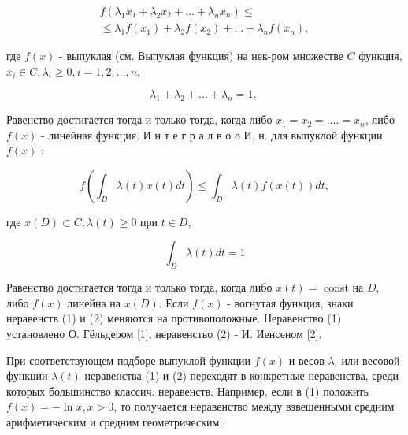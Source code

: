 \documentclass[10pt]{article}
\begin{document}
\[

\begin{gathered}

f\left(\lambda_{1} x_{1}+\lambda_{2} x_{2}+\ldots+\lambda_{n} x_{n}\right) \leqslant \\

\leqslant \lambda_{1} f\left(x_{1}\right)+\lambda_{2} f\left(x_{2}\right)+\ldots+\lambda_{n} f\left(x_{n}\right),

\end{gathered}

\]



где $f(x)$ - выпуклая (см. Выпуклая функция) на нек-ром множестве $C$ функция, $x_{i} \in C, \lambda_{i} \geqslant 0, i=1,2, \ldots, n$,



\[

\lambda_{1}+\lambda_{2}+\ldots+\lambda_{n}=1 \text {. }

\]



Равенство достигается тогда и только тогда, когда либо $x_{1}=x_{2}=\ldots .=x_{n}$, либо $f(x)$ - линейная функция. И н т е г р а л в о о И. н. для выпуклой функции $f(x)$ :



\[

f\left(\int_{D} \lambda(t) x(t) d t\right) \leqslant \int_{D} \lambda(t) f(x(t)) d t,

\]



где $x(D) \subset C, \lambda(t) \geqslant 0$ при $t \in D$,



\[

\int_{D} \lambda(t) d t=1

\]



Равенство достигается тогда и только тогда, когда либо $x(t)=$ const на $D$, либо $f(x)$ линейна на $x(D)$. Если $f(x)$ - вогнутая функция, знаки неравенств (1) и (2) меняются на противоположные. Неравенство (1) установлено О. Гёльдером [1], неравенство (2) - И. Иенсеном [2].



При соответствующем подборе выпуклой функции $f(x)$ и весов $\lambda_{i}$ или весовой функции $\lambda(t)$ неравенства (1) и (2) переходят в конкретные неравенства, среди которых большинство классич. неравенств. Например, если в (1) положить $f(x)=-\ln x, x>0$, то получается неравенство между взвешенными средним арифметическим и средним геометрическим:
\end{document}
